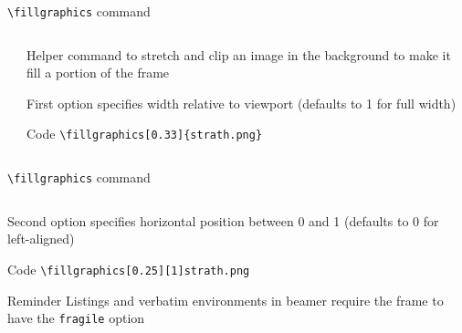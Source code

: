\documentclass[aspectratio=169]{beamer}
\begin{document}
\begin{frame}[fragile]{\texttt{\textbackslash{}fillgraphics} command}
	\begin{columns}
		\begin{column}{0.33\textwidth}
		\end{column}
		\begin{column}{0.65\textwidth}
			\begin{block}{}
				Helper command to stretch and clip an image in the background to make it fill a portion of the frame
			\end{block}
			\begin{block}{}
				First option specifies width relative to viewport (defaults to 1 for full width)
			\end{block}
			\begin{exampleblock}{Code}\small
				\verb|\fillgraphics[0.33]{strath.png}|
			\end{exampleblock}
		\end{column}
	\end{columns}
\end{frame}

\begin{frame}[fragile]{\texttt{\textbackslash{}fillgraphics} command}
	\fillgraphics[0.25][1]{strath.png}
	\begin{columns}
		\begin{column}{0.72\textwidth}
			\begin{block}{}
				Second option specifies horizontal position between 0 and 1 (defaults to 0 for left-aligned)
			\end{block}
			\begin{exampleblock}{Code}
				\texttt{\textbackslash{}fillgraphics[0.25][1]{strath.png}}
			\end{exampleblock}
			\begin{alertblock}{Reminder}
				Listings and verbatim environments in beamer require the frame to have the \verb|fragile| option
			\end{alertblock}
		\end{column}
		\begin{column}{0.25\textwidth}
		\end{column}
	\end{columns}
\end{frame}
\end{document}
